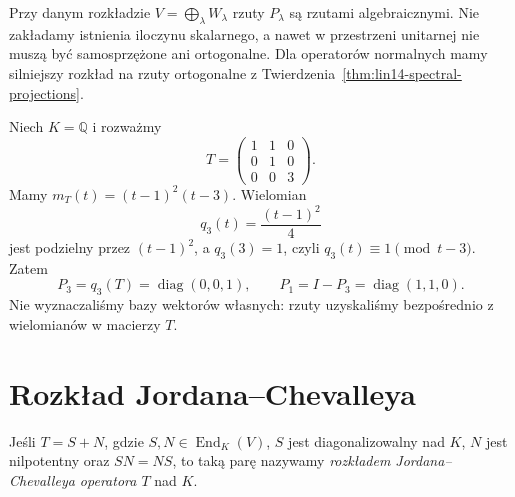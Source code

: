 \begin{uwaga}
\label{rem:lin18-not-orthogonal}
Przy danym rozkładzie
\(V=\bigoplus_\lambda W_\lambda\)
rzuty \(P_\lambda\) są rzutami algebraicznymi.
Nie zakładamy istnienia iloczynu skalarnego,
a nawet w przestrzeni unitarnej nie muszą
być samosprzężone ani ortogonalne.
Dla operatorów normalnych mamy
silniejszy rozkład na rzuty ortogonalne
z Twierdzenia~\ref{thm:lin14-spectral-projections}.
\end{uwaga}

\begin{przyklad}
\label{prz:lin18-projector-polynomial}
Niech \(K=\mathbb Q\) i rozważmy
\[
 T=
 \begin{pmatrix}
  1&1&0\\0&1&0\\0&0&3
 \end{pmatrix}.
\]
Mamy \(m_T(t)=(t-1)^2(t-3)\).
Wielomian
\[
 q_3(t)=\frac{(t-1)^2}{4}
\]
jest podzielny przez \((t-1)^2\),
a \(q_3(3)=1\), czyli
\(q_3(t)\equiv1\pmod{t-3}\).
Zatem
\[
 P_3=q_3(T)=\operatorname{diag}(0,0,1),
 \qquad
 P_1=I-P_3=\operatorname{diag}(1,1,0).
\]
Nie wyznaczaliśmy bazy wektorów własnych:
rzuty uzyskaliśmy bezpośrednio
z wielomianów w macierzy \(T\).
\end{przyklad}

\section{Rozkład Jordana--Chevalleya}
\label{sec:lin18-chevalley}

\begin{definicja}
\label{def:lin18-chevalley}
Jeśli \(T=S+N\), gdzie
\(S,N\in\operatorname{End}_K(V)\),
\(S\) jest diagonalizowalny nad \(K\),
\(N\) jest nilpotentny oraz \(SN=NS\),
to taką parę nazywamy
\emph{rozkładem Jordana--Chevalleya operatora \(T\)}
nad \(K\).
\end{definicja}

